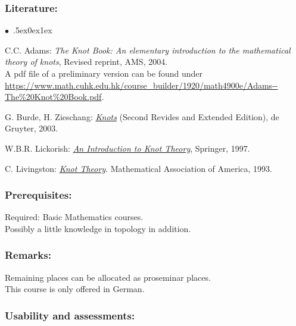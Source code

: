 \documentclass[a4paper,10pt]{article}
\renewenvironment{itemize}{\begin{list}{$\bullet$\ }{\itemsep.5ex\setlength{\topsep}{0.5\itemsep}\parsep0ex\labelsep1ex\settowidth{\labelwidth}{$\bullet$\ }\setlength{\leftmargin}{\labelwidth}\addtolength{\leftmargin}{3ex}\addtolength{\leftmargin}{\labelsep}}}{\end{list}}
\begin{document}
\subsubsection*{\large
    Literature:
}
\begin{itemize} 
\item C.C. Adams: \textit{The Knot Book: An elementary introduction to the mathematical theory of knots}, Revised reprint, AMS, 2004.\\
A pdf file of a preliminary version can be found under \url{https://www.math.cuhk.edu.hk/course\_builder/1920/math4900e/Adams--The\%20Knot\%20Book.pdf}.            
\item G. Burde, H. Zieschang: \href{https://www.maths.ed.ac.uk/~v1ranick/papers/burdzies.pdf}{\textit{Knots}} (Second Revides and Extended Edition), de Gruyter, 2003.
\item W.B.R. Lickorish: \href{http://www.redi-bw.de/start/unifr/EBooks-springer/10.1007/978-1-4612-0691-0}{\textit{An Introduction to Knot Theory}}, Springer, 1997.
\item C. Livingston: \href{https://www.math.cuhk.edu.hk/course\_builder/1920/math4900e/Livingston\%20C.---Knot\%20theory\%20(MAA,\%201996).pdf}{\textit{Knot Theory}}. Mathematical Association of America, 1993.
\end{itemize}
\subsubsection*{\large
    Prerequisites:
}
Required: Basic Mathematics courses. \\ Possibly a little  knowledge in topology in addition.
\subsubsection*{\large
    Remarks:
}
Remaining places can be allocated as proseminar places. \\ This course is only offered in German.
\subsubsection*{\large
    Usability and assessments:
}
\end{document}
